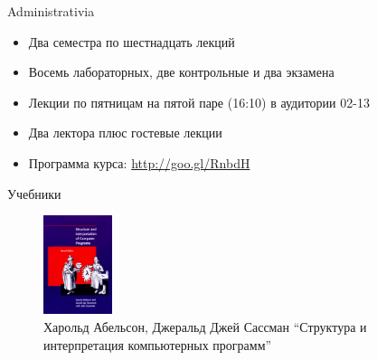 \documentclass{beamer}
\begin{document}
\begin{frame}{Administrativia}
  \begin{itemize}
  \item Два семестра по шестнадцать лекций
  \item Восемь лабораторных, две контрольные и два экзамена\pause
  \item Лекции по пятницам на пятой паре (16:10) в аудитории 02-13\pause
  \item Два лектора плюс гостевые лекции\pause
  \item Программа курса: \url{http://goo.gl/RnbdH}
  \end{itemize}
\end{frame}

\begin{frame}{Учебники}
  \begin{figure}[h]
    \begin{minipage}[h]{0.49\linewidth}
      \begin{center}
          \includegraphics[width=20mm]{lecture0/SICP.eps}
          \caption{Харольд Абельсон, Джеральд Джей Сассман ``Структура и интерпретация компьютерных программ''}
      \end{center}
    \end{minipage}
  \end{figure}
\end{frame}
\end{document}

